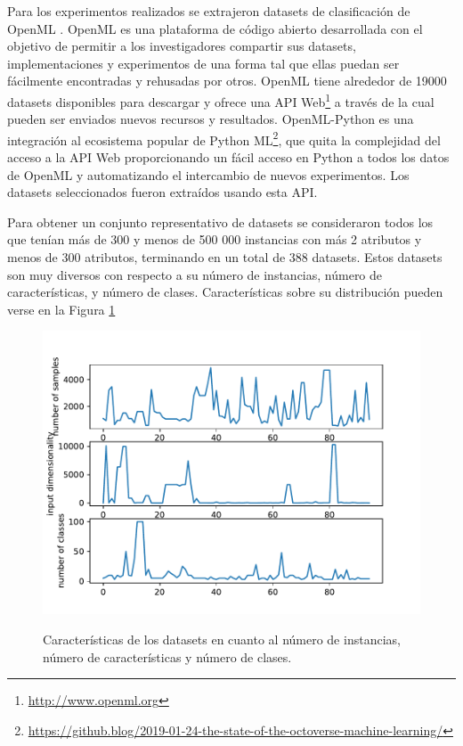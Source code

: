 Para los experimentos realizados se extrajeron datasets de clasificación de OpenML \cite{vanschoren2014openml}. OpenML es una plataforma de código abierto desarrollada con el objetivo de permitir a los investigadores compartir sus datasets, implementaciones y experimentos de una forma tal que ellas puedan ser fácilmente encontradas y rehusadas por otros. OpenML tiene alrededor de 19000 datasets disponibles para descargar y ofrece una API Web\footnote{\url{http://www.openml.org}} a través de la cual pueden ser enviados nuevos recursos y resultados. OpenML-Python \cite{feurer2019openmlpy} es una integración al ecosistema popular de Python ML\footnote{\url{https://github.blog/2019-01-24-the-state-of-the-octoverse-machine-learning/}}, que quita la complejidad del acceso a la API Web proporcionando un fácil acceso en Python a todos los datos de OpenML y automatizando el intercambio de nuevos experimentos. Los datasets seleccionados fueron extraídos usando esta API.
 
 Para obtener un conjunto representativo de datasets se consideraron todos los que tenían más de 300  y menos de 500 000 instancias con más 2 atributos y menos de 300 atributos, terminando en un total de 388 datasets. Estos datasets son muy diversos con respecto a su número de instancias, número de características, y número de clases. Características sobre su distribución pueden verse en la Figura \ref{fig:datasets}
 
 \begin{figure}[H]
\centering
\includegraphics[scale=.75]{Figures/mtf lineplot.pdf}
\label{fig:datasets}
\caption{Características de los datasets en cuanto al número de instancias, número de características y número de clases.}
\end{figure}
 
